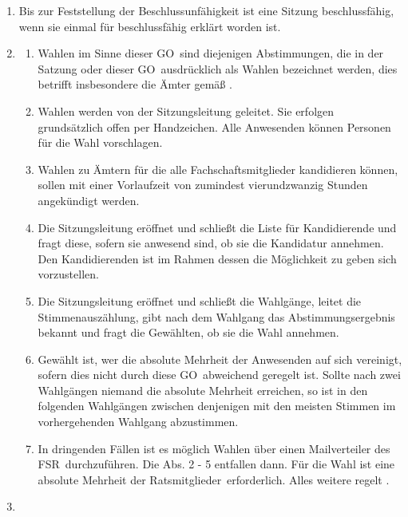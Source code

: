 \documentclass[a4paper, 12pt, ngerman]{article}
\newcommand{\rates}{FSR}
\newcommand{\go}{GO}
\newcommand{\mitglieder}{Ratsmitglieder}
\begin{document}
\begin{enumerate}[leftmargin=0cm]
	\newpage
	
	
	\item {}
	
		Bis zur Feststellung der Beschlussunfähigkeit ist eine Sitzung
		beschlussfähig, wenn sie einmal für beschlussfähig erklärt
		worden ist.
	
	\item {}\label{wahlen}
	
	\begin{enumerate}[leftmargin=0cm]
		\item Wahlen im Sinne dieser \go~sind diejenigen Abstimmungen, die in der Satzung oder dieser \go~ausdrücklich als Wahlen bezeichnet werden, dies betrifft insbesondere die Ämter gemäß .
		\item Wahlen werden von der Sitzungsleitung geleitet. Sie erfolgen grundsätzlich offen per Handzeichen. Alle Anwesenden können Personen für die Wahl vorschlagen.
		\item Wahlen zu Ämtern für die alle Fachschaftsmitglieder kandidieren können, sollen mit einer Vorlaufzeit von zumindest vierundzwanzig Stunden angekündigt werden.
		\item Die Sitzungsleitung eröffnet und schließt die Liste für Kandidierende und fragt diese, sofern sie anwesend sind, ob sie die Kandidatur annehmen. Den Kandidierenden ist im Rahmen dessen die Möglichkeit zu geben sich vorzustellen.
		\item Die Sitzungsleitung eröffnet und schließt die Wahlgänge, leitet
		die Stimmenauszählung, gibt nach dem Wahlgang das
		Abstimmungsergebnis bekannt und fragt die Gewählten, ob sie
		die Wahl annehmen.
		\item Gewählt ist, wer die absolute Mehrheit der Anwesenden auf sich vereinigt, sofern dies nicht durch diese \go~abweichend geregelt ist. Sollte nach zwei Wahlgängen niemand die absolute Mehrheit erreichen, so ist in den folgenden Wahlgängen zwischen denjenigen mit den meisten Stimmen im vorhergehenden Wahlgang abzustimmen.
		\item In dringenden Fällen ist es möglich Wahlen über einen Mailverteiler des \rates~durchzuführen. Die Abs. 2 - 5 entfallen dann. Für die Wahl ist eine absolute Mehrheit der \mitglieder~erforderlich. Alles weitere regelt .
	\end{enumerate}

	\item {}\label{abstimmung}
	

\end{enumerate}
\end{document}
